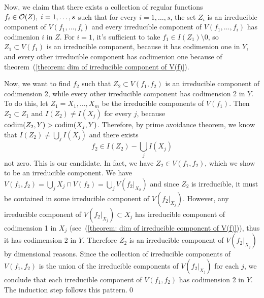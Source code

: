 Now, we claim that there exists a collection of regular functions $f_i\in\mathcal{O}(Z),\;i=1,\dots,s$ such that 
for every $i=1,\dots,s$, the set
$Z_{i}$ is an irreducible component of $V(f_1,\dots, f_{i})$ and every irreducible component of 
$V(f_1,\dots, f_i)$ has codimenion $i$ in $Z$. For $i=1$, it's sufficient to take 
$f_1\in I(Z_1)\setminus0$, so $Z_1\subset V(f_1)$ is an irreducible component, because it has 
codimenion one in $Y$, and every other irreducible component has codimenion one because of 
theorem~(\ref{theorem: dim of irreducible component of V(f)}).\par  
Now, we want to find 
$f_2$ such that $Z_2\subset V(f_1,f_2)$ is an irreducible component of codimension 2, while every other irreducible 
component has codimension 2 in $Y$. To do this, let 
$Z_1 = X_1,\dots, X_m$ be the irreducible components of $V(f_1)$. Then 
$Z_2\subset Z_1$ and $I(Z_2)\neq I(X_j)$ for every $j$, because 
$\text{codim}(Z_2,Y)>\text{codim}(X_j,Y)$. Therefore, by prime avoidance theorem, we know that 
$I(Z_2)\neq \bigcup_j I(X_j)$ and there exists 
\begin{equation}
    f_2 \in I(Z_2)-\bigcup_j I(X_j) 
\end{equation}
not zero. This is our candidate. In fact, we have $Z_2\in V(f_1,f_2)$, which we show to be an irreducible component. 
We have $V(f_1,f_2)=\bigcup_j X_j\cap V(f_2)=\bigcup_j V(f_2|_{X_2})$ and since 
$Z_2$ is irreducible, it must be contained in some irreducible component of $V(f_2|_{X_j})$. However, any 
irreducible component of $V(f_2|_{X_j})\subset X_j$ has irreducible component of codimension 1 in $X_j$ 
(see~(\ref{theorem: dim of irreducible component of V(f)})), thus 
it has codimension 2 in $Y$. Therefore $Z_2$ is an irreducible component of $V(f_2|_{X_j})$ by dimensional reasons. 
Since the collection of irreducible components of $V(f_1,f_2)$ is the union of the irreducible components 
of $V(f_2|_{X_j})$ for each $j$, we conclude that each irreducible component of $V(f_1,f_2)$ has codimension 2 in $Y$. 
The induction step follows this pattern.\qed


